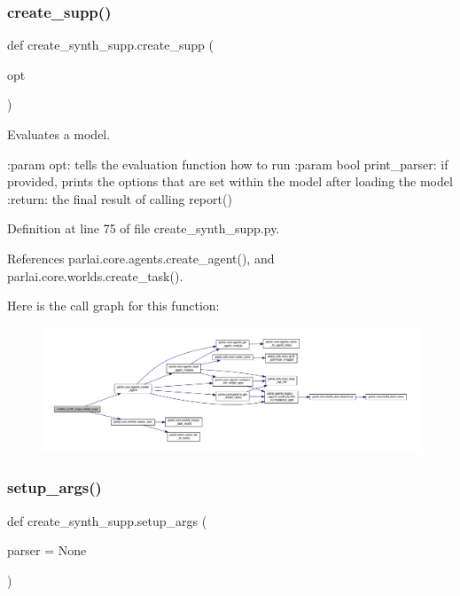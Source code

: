 \subsubsection{\texorpdfstring{create\+\_\+supp()}{create\_supp()}}
{\footnotesize\ttfamily def create\+\_\+synth\+\_\+supp.\+create\+\_\+supp (\begin{DoxyParamCaption}\item[{}]{opt }\end{DoxyParamCaption})}

\begin{DoxyVerb}Evaluates a model.

:param opt: tells the evaluation function how to run
:param bool print_parser: if provided, prints the options that are set within the
    model after loading the model
:return: the final result of calling report()
\end{DoxyVerb}
 

Definition at line 75 of file create\+\_\+synth\+\_\+supp.\+py.



References parlai.\+core.\+agents.\+create\+\_\+agent(), and parlai.\+core.\+worlds.\+create\+\_\+task().

Here is the call graph for this function\+:
\nopagebreak
\begin{figure}[H]
\begin{center}
\leavevmode
\includegraphics[width=350pt]{namespacecreate__synth__supp_a4ab3a83853f9e0e6a13b9db0d4aa79f0_cgraph}
\end{center}
\end{figure}
\mbox{\label{namespacecreate__synth__supp_a1d35bf34b52be13a73c4a7b9d2ba0274}} 
\subsubsection{\texorpdfstring{setup\+\_\+args()}{setup\_args()}}
{\footnotesize\ttfamily def create\+\_\+synth\+\_\+supp.\+setup\+\_\+args (\begin{DoxyParamCaption}\item[{}]{parser = {\ttfamily None} }\end{DoxyParamCaption})}



